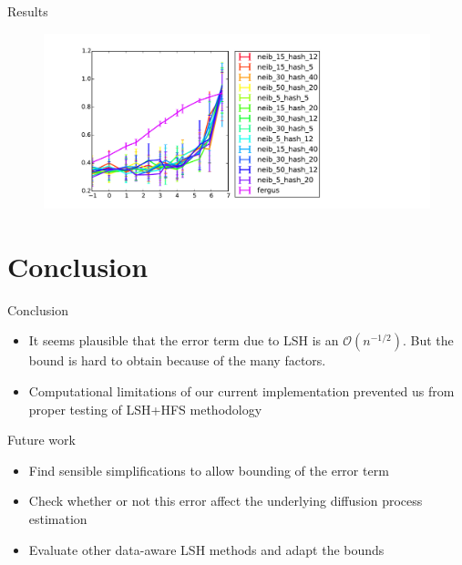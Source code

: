 \documentclass[11pt)]{beamer}
\begin{document}
\begin{frame}{Results}
\begin{figure}
  \includegraphics[width=\textwidth]{method_comp.pdf}
\end{figure}
\end{frame}

\section{Conclusion}
\begin{frame}{Conclusion}
\begin{itemize}
\item It seems plausible that the error term due to LSH is an $\mathcal{O}(n^{-1/2})$. But the bound is hard to obtain because of the many factors.
\item Computational limitations of our current implementation prevented us from proper testing of LSH+HFS methodology
\end{itemize}
\end{frame}

\begin{frame}{Future work}
\begin{itemize}
 
 \item Find sensible simplifications to allow bounding of the error term
 \item Check whether or not this error affect the underlying diffusion process estimation
 \item Evaluate other data-aware LSH methods and adapt the bounds
\end{itemize}
\end{frame}
\end{document}
